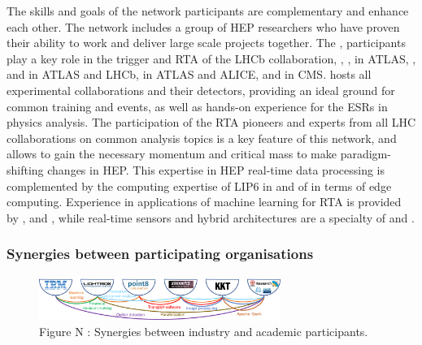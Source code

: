 The skills and goals of the network participants are complementary and enhance each other. 
The \acronym network includes a group of HEP researchers who have proven their ability to work and deliver large scale projects together. 
The \dortmundentity, \santiagoentity participants play a key role in the trigger and RTA of the LHCb collaboration, \ohioentity, \pisaentity, \oregonentity in ATLAS, \cnrsentity, \nikhef and \heidelbergentity in ATLAS and LHCb, \lundentity in ATLAS and ALICE, \helsinkientity and \cernentity in CMS.
\cernentity hosts all experimental collaborations and their detectors, providing an ideal ground for common training and events, as well as hands-on experience for the ESRs in physics analysis. 
The participation of the RTA pioneers and experts from all LHC collaborations on common analysis topics is a key feature of this network, and allows to gain the necessary momentum and critical mass to make paradigm-shifting changes in HEP. 
This expertise in HEP real-time data processing is complemented by the computing expertise of LIP6 in \cnrsentity and of \fleetmaticsentity in terms of edge computing.  
Experience in applications of machine learning for RTA is provided by \ibmentity, \ximantisentity and \pointeightentity, while real-time sensors and hybrid architectures are a specialty of \lightboxentity and \fleetmaticsentity. 

\vspace{-2mm}
\subsubsection{Synergies between participating organisations}
\label{sec:synergy}

\begin{figure}
	\includegraphics[width=0.7\textwidth]{figs/SMARTHEP_InteractionIndustryAcademia} %
	\caption*{Figure N : Synergies between industry and academic participants.\label{fig:synergies}}
\end{figure}

